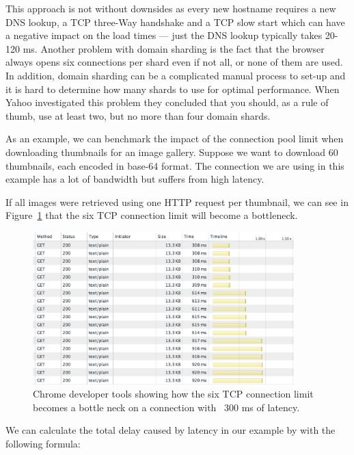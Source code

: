 \documentclass{cslthse-msc}
\begin{document}
This approach is not without downsides as every new hostname requires a new DNS lookup, a TCP three-Way handshake and a TCP slow start which can have a negative impact on the load times\cite[page 199]{HPBN} --- just the DNS lookup typically takes 20-120 ms\cite[page 63]{HPWS}. Another problem with domain sharding is the fact that the browser always opens six connections per shard even if not all, or none of them are used. In addition, domain sharding can be a complicated manual process to set-up and it is hard to determine how many shards to use for optimal performance. When Yahoo investigated this problem they concluded that you should, as a rule of thumb, use at least two, but no more than four domain shards\cite{yahoo-performance-4}.

As an example, we can benchmark the impact of the connection pool limit when downloading thumbnails for an image gallery. Suppose we want to download 60 thumbnails, each encoded in base-64 format. The connection we are using in this example has a lot of bandwidth but suffers from high latency.

If all images were retrieved using one HTTP request per thumbnail, we can see in Figure~\ref{fig:tcp_bottleneck} that the six TCP connection limit will become a bottleneck.

\begin{figure}[H]
  \centering
    \begin{center}
      \includegraphics[width=0.9\textwidth]{images/chrome_latency_limit.png}
    \end{center}
  \caption{Chrome developer tools showing how the six TCP connection limit becomes a bottle neck on a connection with ~300 ms of latency.}
  \label{fig:tcp_bottleneck}
\end{figure}

We can calculate the total delay caused by latency in our example by with the following formula:
\end{document}
